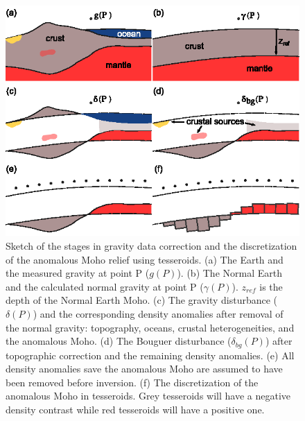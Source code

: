 \documentclass[extra]{gji}
\begin{document}
\begin{figure}
    \centering
    \includegraphics{figures/problem-concept}
    \caption{
        Sketch of the stages in gravity data correction and
        the discretization of the anomalous Moho relief using tesseroids.
        (a) The Earth and the measured gravity at point P ($g(P)$).
        (b) The Normal Earth and the calculated normal gravity at point P
        ($\gamma(P)$). $z_{ref}$ is the depth of the Normal Earth Moho.
        (c) The gravity disturbance ($\delta(P)$) and
        the corresponding density anomalies after removal of the normal gravity:
        topography, oceans, crustal heterogeneities, and the anomalous Moho.
        (d) The Bouguer disturbance ($\delta_{bg}(P)$) after topographic
        correction and the remaining density anomalies.
        (e) All density anomalies save the anomalous Moho are assumed to have
        been removed before inversion.
        (f) The discretization of the anomalous Moho in tesseroids. Grey
        tesseroids will have a negative density contrast while red tesseroids
        will have a positive one.
    }
    \label{fig:anomalysketch}
\end{figure}
\end{document}
